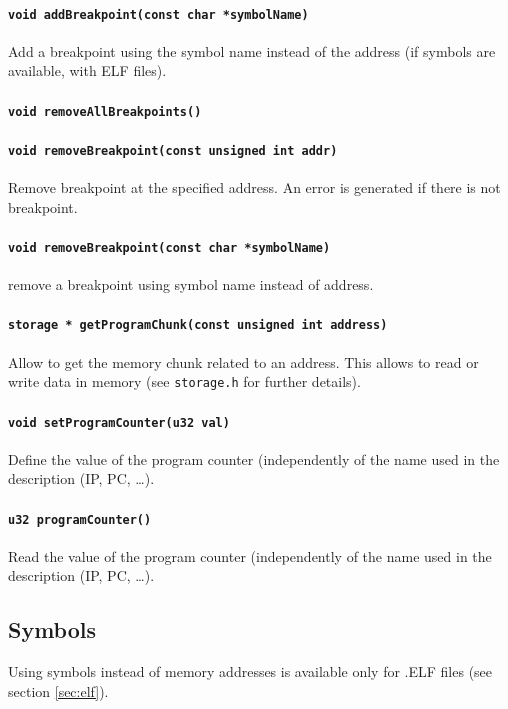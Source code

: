 \paragraph{\texttt{void addBreakpoint(const char *symbolName)}} Add a breakpoint using the symbol name instead of the address (if symbols are available, with ELF files).
\paragraph{\texttt{void removeAllBreakpoints()}} 
\paragraph{\texttt{void removeBreakpoint(const unsigned int addr)}} Remove breakpoint at the specified address. An error is generated if there is not breakpoint.
\paragraph{\texttt{void removeBreakpoint(const char *symbolName)}} remove a breakpoint using symbol name instead of address.

\paragraph{\texttt{storage * getProgramChunk(const unsigned int address)}} Allow to get the memory chunk related to an address. This allows to read or write data in memory (see \texttt{storage.h} for further details).
\paragraph{\texttt{void setProgramCounter(u32 val)}} Define the value of the program counter (independently of the name used in the description (IP, PC,  \ldots).

\paragraph{\texttt{u32 programCounter()}} Read the value of the program counter (independently of the name used in the description (IP, PC,  \ldots).

\subsection{Symbols}
Using symbols instead of memory addresses is available only for .ELF files (see section \ref{sec:elf}).

